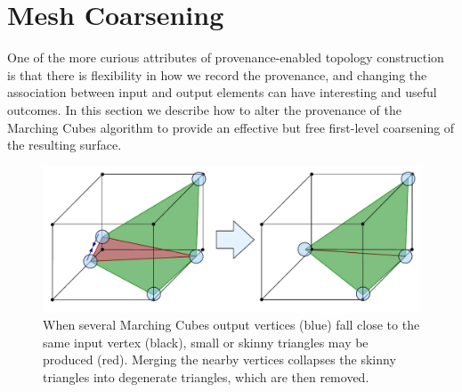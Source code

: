 \documentclass[10pt,journal,cspaper,compsoc]{IEEEtran}
\begin{document}
\section{Mesh Coarsening}
\label{sec:coarsening}

One of the more curious attributes of provenance-enabled topology
construction is that there is flexibility in how we record the provenance,
and changing the association between input and output elements can have
interesting and useful outcomes.  In this section we describe how to alter
the provenance of the Marching Cubes algorithm to provide an effective but
free first-level coarsening of the resulting surface.

\begin{figure}[htb]
\begin{center}
\includegraphics[width=\columnwidth]{SkinnyCollapse.pdf}
\caption{When several Marching Cubes output vertices (blue) fall close to
  the same input vertex (black), small or skinny triangles may be produced
  (red).  Merging the nearby vertices collapses the skinny triangles into
  degenerate triangles, which are then removed. }
\label{fig:SkinnyCollapse}
\end{center}
\end{figure}


\end{document}
